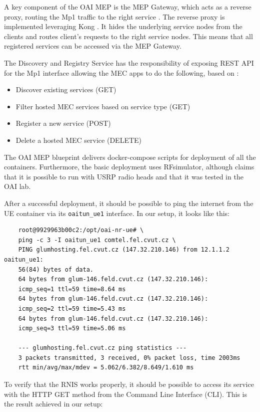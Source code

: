 \documentclass[12pt,a4paper,twoside]{report}
\begin{document}
A key component of the OAI MEP is the MEP Gateway, which acts as a reverse proxy, routing the Mp1 traffic to the right service \cite{oai-mep-git}. The reverse proxy is implemented leveraging Kong \cite{kong-docu}. It hides the underlying service nodes from the clients and routes client’s requests to the right service nodes. This means that all registered services can be accessed via the MEP Gateway.

The Discovery and Registry Service has the responsibility of exposing REST API for the Mp1 interface allowing the MEC apps to do the following, based on \cite{oai-mep-git}:
%
\begin{itemize}
	\item Discover existing services (GET)
	\item Filter hosted MEC services based on service type (GET)
	\item Register a new service (POST)
	\item Delete a hosted MEC service (DELETE)
\end{itemize}
%
The OAI MEP blueprint delivers docker-compose scripts for deployment of all the containers. Furthermore, the basic deployment uses RFsimulator, although \cite{oai-blueprint-git} claims that it is possible to run with USRP radio heads and that it was tested in the OAI lab. 

After a successful deployment, it should be possible to ping the internet from the UE container via its \verb|oaitun_ue1| interface. In our setup, it looks like this:

\begin{verbatim}
	root@9929963b00c2:/opt/oai-nr-ue# \
	ping -c 3 -I oaitun_ue1 comtel.fel.cvut.cz \
	PING glumhosting.fel.cvut.cz (147.32.210.146) from 12.1.1.2 oaitun_ue1:
	56(84) bytes of data.
	64 bytes from glum-146.feld.cvut.cz (147.32.210.146):
	icmp_seq=1 ttl=59 time=8.64 ms
	64 bytes from glum-146.feld.cvut.cz (147.32.210.146):
	icmp_seq=2 ttl=59 time=5.43 ms
	64 bytes from glum-146.feld.cvut.cz (147.32.210.146):
	icmp_seq=3 ttl=59 time=5.06 ms

	--- glumhosting.fel.cvut.cz ping statistics ---
	3 packets transmitted, 3 received, 0% packet loss, time 2003ms
	rtt min/avg/max/mdev = 5.062/6.382/8.649/1.610 ms
\end{verbatim}

To verify that the RNIS works properly, it should be possible to access its service with the HTTP GET method from the Command Line Interface (CLI). This is the result achieved in our setup:
\end{document}
